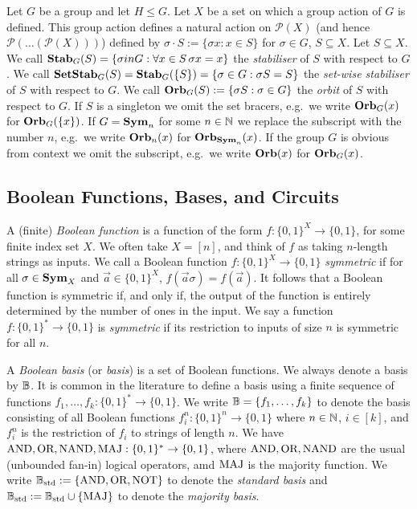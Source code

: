 \documentclass[../paper.tex]{subfiles}
\begin{document}
Let $G$ be a group and let $H \leq G$. Let $X$ be a set on which a group action
of $G$ is defined. This group action defines a natural action on
$\mathcal{P}(X)$ (and hence $\mathcal{P}(\ldots(\mathcal{P}(X)))$) defined by
$\sigma \cdot S := \{\sigma x : x \in S\}$ for $\sigma \in G$, $S \subseteq X$.
Let $S \subseteq X$. We call $\text{\textbf{Stab}}_G(S) = \{\sigma in G : \forall x \in S \,
\sigma x = x\}$ the \emph{stabiliser} of $S$ with respect to $G$. We call
$\text{\textbf{SetStab}}_G(S) = \text{\textbf{Stab}}_G(\{S\}) = \{\sigma \in G : \sigma S = S\}$ the
\emph{set-wise stabiliser} of $S$ with respect to $G$. We call $\text{\textbf{Orb}}_G(S) :=
\{\sigma S : \sigma \in G\}$ the \emph{orbit} of $S$ with respect to $G$. If $S$
is a singleton we omit the set bracers, e.g.\ we write $\text{\textbf{Orb}}_G(x)$ for
$\text{\textbf{Orb}}_G(\{x\})$. If $G = \text{\textbf{Sym}}_n$ for some $n \in \mathbb{N}$ we replace the subscript
with the number $n$, e.g.\ we write $\text{\textbf{Orb}}_n(x)$ for $\text{\textbf{Orb}}_{\text{\textbf{Sym}}_n}(x)$. If the
group $G$ is obvious from context we omit the subscript, e.g.\ we write
$\text{\textbf{Orb}}(x)$ for $\text{\textbf{Orb}}_G(x)$.

\subsection{Boolean Functions, Bases, and Circuits}
A (finite) \emph{Boolean function} is a function of the form $f: \{0,1\}^X
\rightarrow \{0,1\}$, for some finite index set $X$. We often take $X = [n]$,
and think of $f$ as taking $n$-length strings as inputs. We call a Boolean
function $f: \{0,1\}^X \rightarrow \{0,1\}$ \emph{symmetric} if for all $\sigma
\in \text{\textbf{Sym}}_X$ and $\vec{a} \in \{0,1\}^X$, $f (\vec{a} \sigma) = f(\vec{a})$. It
follows that a Boolean function is symmetric if, and only if, the output of the
function is entirely determined by the number of ones in the input. We say a
function $f : \{0,1\}^{*} \rightarrow \{0,1\}$ is \emph{symmetric} if its
restriction to inputs of size $n$ is symmetric for all $n$.

A \emph{Boolean basis} (or \emph{basis}) is a set of Boolean functions. We
always denote a basis by $\mathbb{B}$. It is common in the literature to define a basis
using a finite sequence of functions $f_1, \ldots , f_k:\{0,1\}^* \rightarrow
\{0,1\}$. We write $\mathbb{B} = \{f_1, \ldots, f_k\}$ to denote the basis consisting
of all Boolean functions $f^n_i : \{0,1\}^n \rightarrow \{0,1\}$ where $n \in
\mathbb{N}$, $i \in [k]$, and $f^n_i$ is the restriction of $f_i$ to strings of
length $n$. We have $\text{\upshape AND}, \text{\upshape OR}, \text{\upshape NAND}, \text{\upshape MAJ} : \{0,1\}^* \rightarrow \{0,1\}$,
where $\text{\upshape AND}, \text{\upshape OR}, \text{\upshape NAND}$ are the usual (unbounded fan-in) logical operators, amd
$\text{\upshape MAJ}$ is the majority function. We write $\mathbb{B}_{\text{std}} := \{\text{\upshape AND}, \text{\upshape OR}, \text{\upshape NOT}\}$ to denote
the \emph{standard basis} and $\mathbb{B}_{\text{std}} := \mathbb{B}_{\text{std}} \cup \{\text{\upshape MAJ}\}$ to denote the
\emph{majority basis}.
\end{document}
